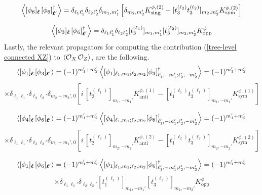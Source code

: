 %
%
\begin{equation}\label{phi6-phibar6}
\expval{
[\phi_6]_{\boldsymbol{\ell}} \,
[\phi_6]^\dagger_{\boldsymbol{\ell}'}
}
=
\delta_{\ell_1 \ell_1'} \delta_{\ell_2 \ell_2'} \delta_{m_1,m_1'}
\left[
\delta_{m_2,m_2'} K^{\phi,(2)}_{\mathrm{sing}}
- [t_3^{(\ell_2)} t_3^{(\ell_2)}]_{m_2, m_2'} K^{\phi,(2)}_{\mathrm{sym}}
\right]
\end{equation}
%
%

%
%
\begin{equation}\label{phi3-phibar6}
\expval{
[\phi_3]_{\boldsymbol{\ell}} \,
[\phi_6]^\dagger_{\boldsymbol{\ell}'}
}
=
\delta_{\ell_1 \ell_1'} \delta_{\ell_2 \ell_2'}
[t_3^{(\ell_1)}]_{m_1, m_1'} [t_3^{(\ell_2)}]_{m_2, m_2'} K^{\phi}_{\mathrm{opp}}
\end{equation}
%
%
Lastly, the relevant propagators for computing the contribution (\ref{tree-level connected XZ}) to $\expval{\mathcal{O}_{X} \, \mathcal{O}_{Z}}$, are the following.
%
%
\begin{equation*}
\expval{
[\phi_1]_{\boldsymbol{\ell}} \,
[\phi_3]_{\boldsymbol{\ell}'}
}
=
(-1)^{m_1' + m_2'} \expval{
[\phi_1]_{\ell_1,m_1;\ell_2,m_2}
[\phi_3]^\dagger_{\ell_1',-m_1';\ell_2',-m_2'}
}
=
(-1)^{m_1' + m_2'}
\end{equation*}
%
%
\begin{equation}
\times
\delta_{\ell_1 \ell_1'} \delta_{\ell_2 \ell_2'}
\delta_{m_2+m_2',0}
\left[
i \, [t_2^{(\ell_1)}]_{m_1, -m_1'} K^{\phi,(1)}_{\text{anti}}
-
[t_1^{(\ell_1)} t_3^{(\ell_1)}]_{m_1, -m_1'} K^{\phi,(1)}_{\mathrm{sym}}
\right]
\end{equation}
%
%

%
%
\begin{equation*}
\expval{
[\phi_4]_{\boldsymbol{\ell}} \,
[\phi_6]_{\boldsymbol{\ell}'}
}
=
(-1)^{m_1' + m_2'} \expval{
[\phi_4]_{\ell_1,m_1;\ell_2,m_2}
[\phi_6]^\dagger_{\ell_1',-m_1';\ell_2',-m_2'}
}
=
(-1)^{m_1' + m_2'}
\end{equation*}
%
%
\begin{equation}
\times
\delta_{\ell_1 \ell_1'} \delta_{\ell_2 \ell_2'}
\delta_{m_1+m_1',0}
\left[
i \, [t_2^{(\ell_2)}]_{m_2, -m_2'} K^{\phi,(2)}_{\text{anti}}
-
[t_1^{(\ell_2)} t_3^{(\ell_2)}]_{m_2, -m_2'} K^{\phi,(2)}_{\mathrm{sym}}
\right]
\end{equation}
%
%

%
%
\begin{equation*}
\expval{
[\phi_1]_{\boldsymbol{\ell}} \,
[\phi_6]_{\boldsymbol{\ell}'}
}
=
(-1)^{m_1' + m_2'} \expval{
[\phi_1]_{\ell_1,m_1;\ell_2,m_2}
[\phi_6]^\dagger_{\ell_1',-m_1';\ell_2',-m_2'}
}
=
(-1)^{m_1' + m_2'}
\end{equation*}
%
%
\begin{equation}
\times
\delta_{\ell_1 \ell_1'} \delta_{\ell_2 \ell_2'}
[t_1^{(\ell_1)}]_{m_1, -m_1'}
[t_3^{(\ell_2)}]_{m_2, -m_2'}
K^{\phi}_{\text{opp}}
\end{equation}
%
%

